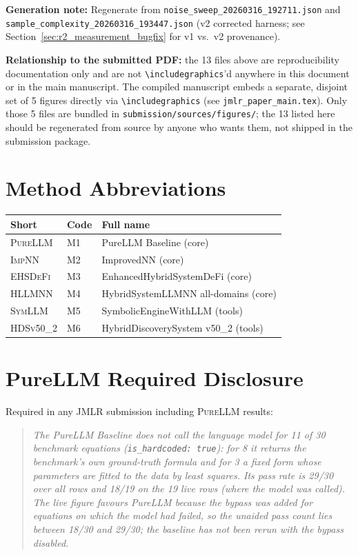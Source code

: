 \documentclass[twoside,11pt]{article}
\newcommand{\PureLLM}{\textsc{PureLLM}}
\newcommand{\INN}{\textsc{ImpNN}}
\newcommand{\EHD}{\textsc{EHSDeFi}}
\newcommand{\HSL}{\textsc{HLLMNN}}
\newcommand{\SEL}{\textsc{SymLLM}}
\newcommand{\HDS}{\textsc{HDSv50\_2}}
\begin{document}
\noindent\textbf{Generation note:} Regenerate from
\texttt{noise\_sweep\_20260316\_192711.json} and
\texttt{sample\_complexity\_20260316\_193447.json} (v2 corrected
harness; see Section~\ref{sec:r2_measurement_bugfix} for v1 vs.\ v2 provenance).

\noindent\textbf{Relationship to the submitted PDF:} the 13 files
above are reproducibility documentation only and are not
\verb|\includegraphics|'d anywhere in this document or in the main
manuscript. The compiled manuscript embeds a separate, disjoint set
of 5 figures directly via \verb|\includegraphics| (see
\texttt{jmlr\_paper\_main.tex}). Only those 5 files are bundled in
\texttt{submission/sources/figures/}; the 13 listed here should be
regenerated from source by anyone who wants them, not shipped in the
submission package.

\section{Method Abbreviations}
\label{app:abbrev}

\begin{tabular}{L{1.8cm} L{2.5cm} L{6.0cm}}
\toprule
\textbf{Short} & \textbf{Code} & \textbf{Full name}\\
\midrule
\PureLLM & M1 & PureLLM Baseline (core)\\
\INN     & M2 & ImprovedNN (core)\\
\EHD     & M3 & EnhancedHybridSystemDeFi (core)\\
\HSL     & M4 & HybridSystemLLMNN all-domains (core)\\
\SEL     & M5 & SymbolicEngineWithLLM (tools)\\
\HDS     & M6 & HybridDiscoverySystem v50\_2 (tools)\\
\bottomrule
\end{tabular}

\section{PureLLM Required Disclosure}
\label{app:disclosure}

Required in any JMLR submission including \PureLLM{} results:

\begin{quote}
\textit{The PureLLM Baseline does not call the language model for 11 of 30
benchmark equations (\texttt{is\_hardcoded: true}): for 8 it returns the benchmark's own
ground-truth formula and for 3 a fixed form whose parameters are fitted to the data by
least squares. Its pass rate is 29/30 over all rows and 18/19 on the 19 live rows
(where the model was called). The live figure favours PureLLM because the bypass
was added for equations on which the model had failed, so the unaided pass count
lies between 18/30 and 29/30; the baseline has not been rerun with the bypass disabled.}

\end{quote}
\end{document}
